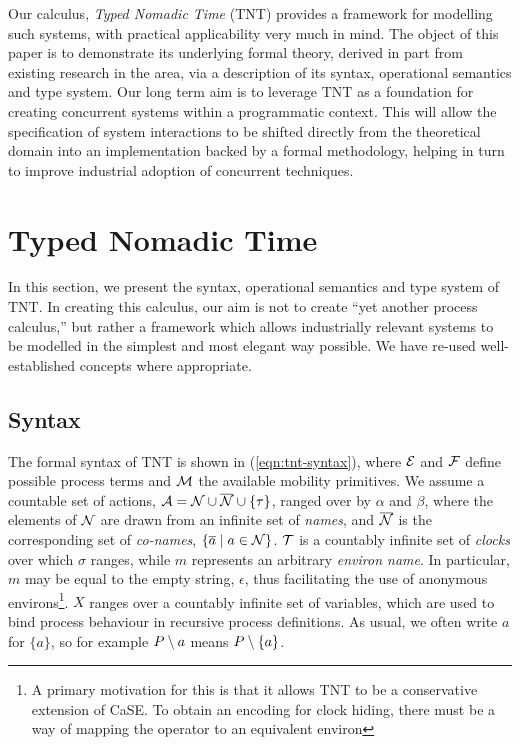 \documentclass[orivec,envcountsame]{llncs}
\begin{document}
Our calculus, \emph{Typed Nomadic Time} (TNT) provides a framework for
modelling such systems, with practical applicability very much in
mind. The object of this paper is to demonstrate its underlying formal
theory, derived in part from existing research in the area, via a
description of its syntax, operational semantics and type system. Our
long term aim is to leverage TNT as a foundation for creating concurrent
systems within a programmatic context. This will allow the specification
of system interactions to be shifted directly from the theoretical
domain into an implementation backed by a formal methodology, helping in
turn to improve industrial adoption of concurrent techniques.

\section{Typed Nomadic Time}
\label{tnt}

In this section, we present the syntax, operational semantics and type
system of TNT. In creating this calculus, our aim is not to create ``yet
another process calculus,'' but rather a framework which allows
industrially relevant systems to be modelled in the simplest and most
elegant way possible. We have re-used well-established concepts where
appropriate.

\subsection{Syntax}

The formal syntax of TNT is shown in (\ref{eqn:tnt-syntax}), where
$\text{$\mathcal{E}$}$ and $\text{$\mathcal{F}$}$ define possible process terms and $\text{$\mathcal{M}$}$ the
available mobility primitives. We assume a countable set of actions,
$\text{$\mathcal{A}$} = \text{$\mathcal{N}$} \cup \text{$\overline{\text{$\mathcal{N}$}}$} \cup \{\tau\}$, ranged over by $\alpha$
and $\beta$, where the elements of $\text{$\mathcal{N}$}$ are drawn from an infinite
set of \emph{names}, and $\text{$\overline{\text{$\mathcal{N}$}}$}$ is the corresponding set of
\emph{co-names}, $\{\overline{a} \mid a \in \text{$\mathcal{N}$}\}$. $\text{$\mathcal{T}$}$ is a
countably infinite set of \emph{clocks} over which $\sigma$ ranges,
while $m$ represents an arbitrary \emph{environ name}. In particular,
$m$ may be equal to the empty string, $\epsilon$, thus facilitating the
use of anonymous environs\footnote{A primary motivation for this is that
it allows TNT to be a conservative extension of CaSE. To obtain an
encoding for clock hiding, there must be a way of mapping the operator
to an equivalent environ}. $X$ ranges over a countably infinite set of
variables, which are used to bind process behaviour in recursive process
definitions.  As usual, we often write $a$ for $\{a\}$, so for example
$P \setminus {a}$ means $P \setminus {\{a\}}$.
\end{document}
